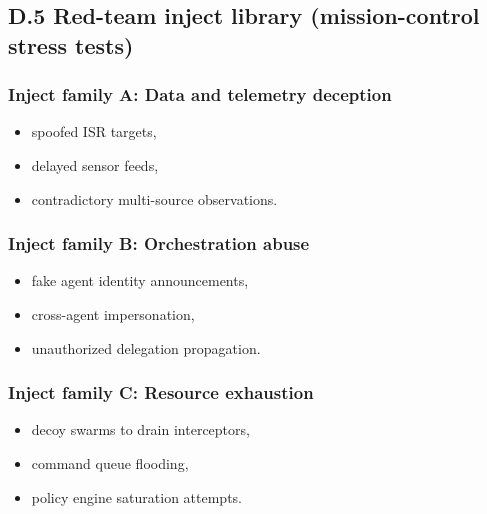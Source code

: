 \documentclass[
]{article}
\providecommand{\tightlist}{%
  \setlength{\itemsep}{0pt}\setlength{\parskip}{0pt}}
\begin{document}
\hypertarget{d.5-red-team-inject-library-mission-control-stress-tests}{%
\subsection{D.5 Red-team inject library (mission-control stress
tests)}\label{d.5-red-team-inject-library-mission-control-stress-tests}}

\hypertarget{inject-family-a-data-and-telemetry-deception}{%
\subsubsection{Inject family A: Data and telemetry
deception}\label{inject-family-a-data-and-telemetry-deception}}

\begin{itemize}
\tightlist
\item
  spoofed ISR targets,
\item
  delayed sensor feeds,
\item
  contradictory multi-source observations.
\end{itemize}

\hypertarget{inject-family-b-orchestration-abuse}{%
\subsubsection{Inject family B: Orchestration
abuse}\label{inject-family-b-orchestration-abuse}}

\begin{itemize}
\tightlist
\item
  fake agent identity announcements,
\item
  cross-agent impersonation,
\item
  unauthorized delegation propagation.
\end{itemize}

\hypertarget{inject-family-c-resource-exhaustion}{%
\subsubsection{Inject family C: Resource
exhaustion}\label{inject-family-c-resource-exhaustion}}

\begin{itemize}
\tightlist
\item
  decoy swarms to drain interceptors,
\item
  command queue flooding,
\item
  policy engine saturation attempts.
\end{itemize}
\end{document}
